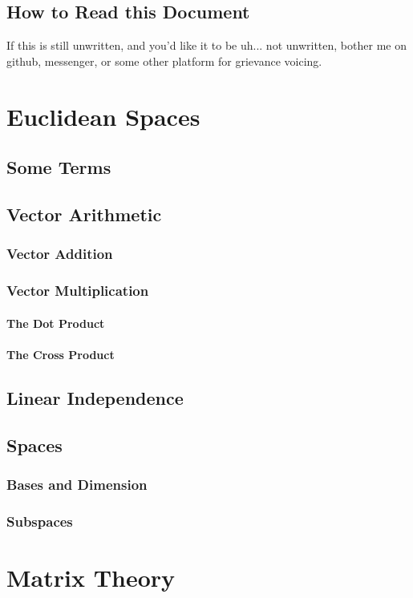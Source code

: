 \documentclass[cm, 10pt, titlepage, oneside]{book}
\begin{document}
  \section{How to Read this Document}
    If this is still unwritten, and you'd like it to be uh... not
    unwritten, bother me on github, messenger, or some other platform
    for grievance voicing.

\chapter{Euclidean Spaces}
  \section{Some Terms}
  \section{Vector Arithmetic}
    \subsection{Vector Addition}
    \subsection{Vector Multiplication}
      \subsubsection{The Dot Product}
      \subsubsection{The Cross Product}
  \section{Linear Independence}
  \section{Spaces}
    \subsection{Bases and Dimension}
    \subsection{Subspaces}

\chapter{Matrix Theory}
\end{document}
